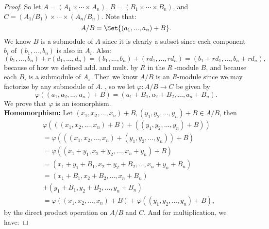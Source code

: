 \documentclass[9pt,reqno,twoside]{amsbook}
\theoremstyle{plain}
\numberwithin{section}{chapter}
\numberwithin{equation}{chapter}
\theoremstyle{definition}
\theoremstyle{remark}
\theoremstyle{plain}
\renewcommand{\phi}{\varphi}
\begin{document}
\begin{enumerate}[label=\arabic*.]
\begin{proof}
So let $A = (A_1 \times \cdots \times A_n)$, $B = (B_1 \times \cdots \times B_n)$, and $C = (A_1/B_1) \times \cdots \times (A_n/B_n)$. Note that: 
$$
A/B = \Set{(a_1,...,a_n) + B}.
$$
We know $B$ is a submodule of $A$ since it is clearly a subset since each component $b_i$ of $(b_1,...,b_n)$ is also in $A_i$. Also: 
$$
(b_1,...,b_n) + r(d_1,...,d_n) = (b_1,...,b_n) + (rd_1,...,rd_n) = (b_1 + rd_1,...,b_n + rd_n),
$$
because of how we defined add. and mult. by $R$ in the $R$ -module $B$, and because each $B_i$ is a submodule of $A_i$. 
Then we know $A/B$ is an $R$-module since we may factorize by any submodule of $A$. , so we let $\phi: A/B \rightarrow C$ be given by $$\phi((a_1,a_2,...,a_n) + B) = (a_1+B_1,a_2+B_2,...,a_n+B_n).$$ 
We prove that $\phi$ is an isomorphism.\\
\textbf{Homomorphism: } Let $(x_1,x_2,...,x_n) + B,(y_1,y_2,...,y_n) + B \in A/B$, then 
\begin{equation}
\begin{aligned}
	&\phi(((x_1,x_2,...,x_n) + B)
	+((y_1,y_2,...,y_n) + B)) \\
	&= \phi(((x_1,x_2,...,x_n)
	+(y_1,y_2,...,y_n)) + B)\\ 
	&= \phi((x_1+y_1,x_2+y_2,...,x_n+y_n) + B) \\
	&= (x_1+y_1+B_1,x_2+y_2+B_2,...,x_n+y_n+B_n)\\
 	&= (x_1+B_1,x_2+B_2,...,x_n+B_n)\\
 	&+(y_1+B_1,y_2+B_2,...,y_n+B_n)\\
  	&= \phi((x_1,x_2,...,x_n) + B)+\phi((y_1,y_2,...,y_n) + B), 
\end{aligned}
\end{equation}
by the direct product operation on $A/B$ and $C$. And for multiplication, we have: 


\end{proof}
\end{enumerate}
\end{document}
